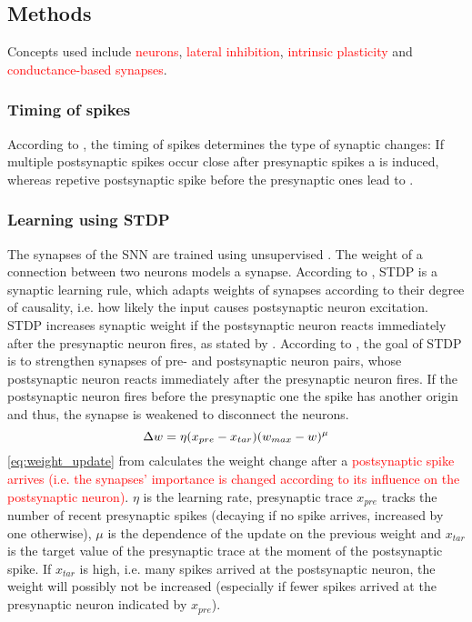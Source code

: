 \subsection{Methods}
\label{subsec:methods}

Concepts used include \textcolor{red}{ neurons}, \textcolor{red}{lateral inhibition}, \textcolor{red}{intrinsic plasticity} and \textcolor{red}{conductance-based synapses}.

\subsubsection{Timing of spikes}
According to \cite{LTP_D_bio}, the timing of spikes determines the type of synaptic changes:
If multiple postsynaptic spikes occur close after presynaptic spikes a  is induced, 
whereas repetive postsynaptic spike before the presynaptic ones lead to .


\subsubsection{Learning using \ac{STDP}}
The synapses of the \ac{SNN} are trained using unsupervised . 
The weight of a connection between two neurons models a synapse.
According to \cite{STDP_like}, \ac{STDP} is a synaptic learning rule, which adapts weights of synapses according to their degree of causality, i.e. how likely the input causes postsynaptic neuron excitation.
\ac{STDP} increases synaptic weight if the postsynaptic neuron reacts immediately after the presynaptic neuron fires, as stated by \cite{object_detection_SNN}.
According to \cite{object_detection_SNN}, the goal of \ac{STDP} is to strengthen synapses of pre- and postsynaptic neuron pairs, whose postsynaptic neuron reacts immediately after the presynaptic neuron fires.
If the postsynaptic neuron fires before the presynaptic one the spike has another origin and thus, the synapse is weakened to disconnect the neurons.
%
\begin{equation}
    \centering
    \label{eq:weight_update}
    \Delta w = \eta (x_{pre} - x_{tar})(w_{max}-w)^\mu
\end{equation}
%
\autoref{eq:weight_update} from \cite{SNN} calculates the weight change after a \textcolor{red}{postsynaptic spike arrives (i.e. the synapses' importance is changed according to its influence on the postsynaptic neuron)}.
$\eta$ is the learning rate, presynaptic trace $x_{pre}$ tracks the number of recent presynaptic spikes (decaying if no spike arrives, increased by one otherwise), $\mu$ is the dependence of the update on the previous weight and $x_{tar}$ is the target value of the presynaptic trace at the moment of the postsynaptic spike.
If $x_{tar}$ is high, i.e. many spikes arrived at the postsynaptic neuron, the weight will possibly not be increased (especially if fewer spikes arrived at the presynaptic neuron indicated by  $x_{pre}$).

